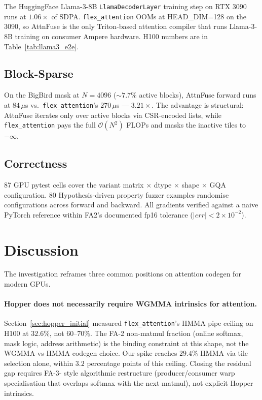 \documentclass[10pt,twocolumn]{article}
\begin{document}
The HuggingFace Llama-3-8B \texttt{LlamaDecoderLayer} training step
on RTX 3090 runs at $1.06\times$ of SDPA. \texttt{flex\_attention}
OOMs at HEAD\_DIM=128 on the 3090, so AttnFuse is the only
Triton-based attention compiler that runs Llama-3-8B training on
consumer Ampere hardware. H100 numbers are in
Table~\ref{tab:llama3_e2e}.

\subsection{Block-Sparse}

On the BigBird mask at $N{=}4096$ ($\sim 7.7\%$ active blocks),
AttnFuse forward runs at $84\,\mu$s vs.\ \texttt{flex\_attention}'s
$270\,\mu$s --- $3.21\times$. The advantage is structural: AttnFuse
iterates only over active blocks via CSR-encoded lists, while
\texttt{flex\_attention} pays the full $\mathcal{O}(N^2)$ FLOPs and
masks the inactive tiles to $-\infty$.

\subsection{Correctness}

87 GPU pytest cells cover the variant matrix
$\times$ dtype $\times$ shape $\times$ GQA configuration. 80
Hypothesis-driven property fuzzer examples randomise configurations
across forward and backward. All gradients verified against a naive
PyTorch reference within FA2's documented fp16 tolerance
($|err| < 2 \times 10^{-2}$).

\section{Discussion}
\label{sec:discussion}

The investigation reframes three common positions on attention
codegen for modern GPUs.

\paragraph{Hopper does not necessarily require WGMMA intrinsics for
attention.} Section~\ref{sec:hopper_initial} measured
\texttt{flex\_attention}'s HMMA pipe ceiling on H100 at $32.6\%$,
not $60$--$70\%$. The FA-2 non-matmul fraction (online softmax,
mask logic, address arithmetic) is the binding constraint at this
shape, not the WGMMA-vs-HMMA codegen choice. Our spike reaches
$29.4\%$ HMMA via tile selection alone, within $3.2$ percentage
points of this ceiling. Closing the residual gap requires FA-3-
style algorithmic restructure (producer/consumer warp
specialisation that overlaps softmax with the next matmul), not
explicit Hopper intrinsics.
\end{document}
